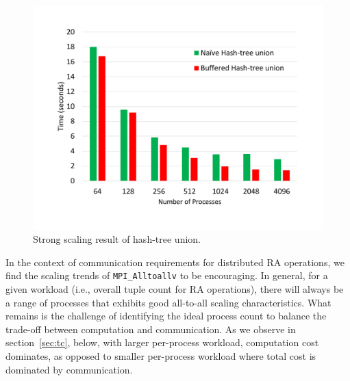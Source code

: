\begin{figure}[h]
	\includegraphics[width=\columnwidth]{results/hash_tree_union.pdf}
	\caption{Strong scaling result of hash-tree union.}
	\label{fig:dist_union}
\end{figure}

In the context of communication requirements for distributed RA operations, we find the scaling trends of \texttt{MPI\_Alltoallv} to be encouraging. In general, for a given workload (i.e., overall tuple count for RA operations), there will always be a range of processes that exhibits good all-to-all scaling characteristics. What remains is the challenge of identifying the ideal process count to balance the trade-off between computation and communication. As we observe in section~\ref{sec:tc}, below, with larger per-process workload, computation cost dominates, as opposed to smaller per-process workload where total cost is dominated by communication. 





